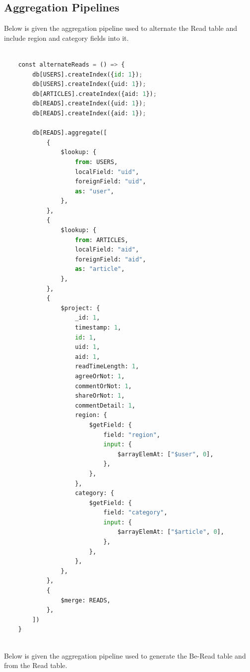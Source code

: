 \documentclass{report}
\begin{document}
    \subsection{Aggregation Pipelines}\label{subsec:appendix-aggregation}
    Below is given the aggregation pipeline used to alternate the Read table and include region and category fields into it.
    \begin{lstlisting}[language=python, caption=Aggregation pipeline for alternating Read table]

    const alternateReads = () => {
        db[USERS].createIndex({id: 1});
        db[USERS].createIndex({uid: 1});
        db[ARTICLES].createIndex({aid: 1});
        db[READS].createIndex({uid: 1});
        db[READS].createIndex({aid: 1});

        db[READS].aggregate([
            {
                $lookup: {
                    from: USERS,
                    localField: "uid",
                    foreignField: "uid",
                    as: "user",
                },
            },
            {
                $lookup: {
                    from: ARTICLES,
                    localField: "aid",
                    foreignField: "aid",
                    as: "article",
                },
            },
            {
                $project: {
                    _id: 1,
                    timestamp: 1,
                    id: 1,
                    uid: 1,
                    aid: 1,
                    readTimeLength: 1,
                    agreeOrNot: 1,
                    commentOrNot: 1,
                    shareOrNot: 1,
                    commentDetail: 1,
                    region: {
                        $getField: {
                            field: "region",
                            input: {
                                $arrayElemAt: ["$user", 0],
                            },
                        },
                    },
                    category: {
                        $getField: {
                            field: "category",
                            input: {
                                $arrayElemAt: ["$article", 0],
                            },
                        },
                    },
                },
            },
            {
                $merge: READS,
            },
        ])
    }
    
    \end{lstlisting}
     Below is given the aggregation pipeline used to generate the Be-Read table and from the Read table.
\end{document}
